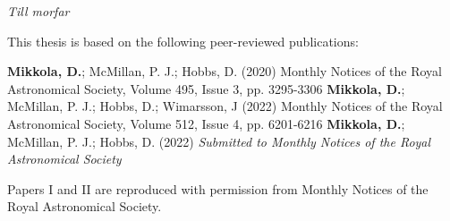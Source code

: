 \documentclass[E5,LUFonts]{lundphdthesis}
\begin{document}
\newpage

\vspace*{140pt}
\begin{flushright}
\textit{Till morfar}
\end{flushright}

\cleardoublepage
\frontmatter
\pagestyle{plain}
\setcounter{page}{1} %
\setcounter{tocdepth}{1}
\setcounter{secnumdepth}{2}
\renewcommand{\thesection}{\arabic{chapter}.\arabic{section}}
\tableofcontents


\newpage
{}

This thesis is based on the following peer-reviewed publications:
\vspace{1mm}

{\textbf{Mikkola, D.}; McMillan, P. J.; Hobbs, D. (2020)}
{Monthly Notices of the Royal Astronomical Society, Volume 495, Issue 3, pp. 3295-3306}
{\textbf{Mikkola, D.}; McMillan, P. J.; Hobbs, D.; Wimarsson, J (2022)}
{Monthly Notices of the Royal Astronomical Society, Volume 512, Issue 4, pp. 6201-6216}
{\textbf{Mikkola, D.}; McMillan, P. J.; Hobbs, D. (2022)}
{\textit{Submitted to Monthly Notices of the Royal Astronomical Society}}%
\makephdarticletable


\noindent Papers I and II are reproduced with permission from Monthly Notices of the Royal Astronomical Society.

\newpage

\end{document}
